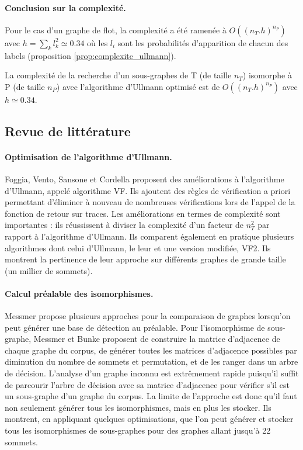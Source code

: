 \paragraph{Conclusion sur la complexité.} 
Pour le cas d'un graphe de flot, la complexité a été ramenée à $O((n_T.h)^{n_P})$ avec $h=\sum_kl_k^2\simeq 0.34$ où les $l_i$ sont les probabilités d'apparition de chacun des labels (proposition \ref{prop:complexite_ullmann}).

\begin{prop}
La complexité de la recherche d'un sous-graphes de T (de taille $n_T$) isomorphe à P (de taille $n_P$) avec l'algorithme d'Ullmann optimisé est de $O((n_T.h)^{n_P})$ avec $h\simeq 0.34$.
\label{prop:complexite_ullmann}
\end{prop}

\subsection{Revue de littérature}
\paragraph{Optimisation de l'algorithme d'Ullmann.}
Foggia, Vento, Sansone et Cordella \cite{VF99} proposent des améliorations à l'algorithme d'Ullmann, appelé algorithme VF.
Ils ajoutent des règles de vérification a priori permettant d'éliminer à nouveau de nombreuses vérifications lors de l'appel de la fonction de retour sur traces.
Les améliorations en termes de complexité sont importantes : ils réussissent à diviser la complexité d'un facteur de $n_T^2$ par rapport à l'algorithme d'Ullmann.
Ils comparent également en pratique plusieurs algorithmes \cite{FSV01} dont celui d'Ullmann, le leur et une version modifiée, VF2. Ils montrent la pertinence de leur approche sur différents graphes de grande taille (un millier de sommets).

\paragraph{Calcul préalable des isomorphismes.}
Messmer \cite{MessPhd} propose plusieurs approches pour la comparaison de graphes lorsqu'on peut générer une base de détection au préalable.
Pour l'isomorphisme de sous-graphe, Messmer et Bunke proposent \cite{MB95} de construire la matrice d'adjacence de chaque graphe du corpus, de générer toutes les matrices d'adjacence possibles par diminution du nombre de sommets et permutation, et de les ranger dans un arbre de décision.
L'analyse d'un graphe inconnu est extrêmement rapide puisqu'il suffit de parcourir l'arbre de décision avec sa matrice d'adjacence pour vérifier s'il est un sous-graphe d'un graphe du corpus.
La limite de l'approche est donc qu'il faut non seulement générer tous les isomorphismes, mais en plus les stocker.
Ils montrent, en appliquant quelques optimisations, que l'on peut générer et stocker tous les isomorphismes de sous-graphes pour des graphes allant jusqu'à 22 sommets.
\\


